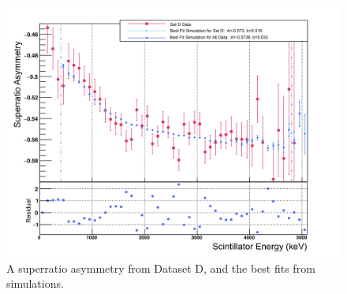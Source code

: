 \begin{figure}[htb]
	\centering
	\includegraphics[width=.999\linewidth]
	{Figures/BestAsymmetry_SetD.png}
	\caption[SetD Superratio Asymmetry]{A superratio asymmetry from Dataset D, and the best fits from simulations.}	
	\label{fig:asymmetryD}
\end{figure}

